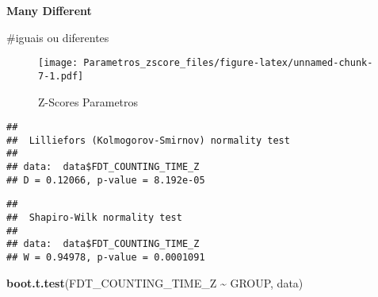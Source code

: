 \documentclass[
]{article}
\newenvironment{Shaded}{\begin{snugshade}}{\end{snugshade}}
\newcommand{\AttributeTok}[1]{\textcolor[rgb]{0.13,0.29,0.53}{#1}}
\newcommand{\DecValTok}[1]{\textcolor[rgb]{0.00,0.00,0.81}{#1}}
\newcommand{\FunctionTok}[1]{\textcolor[rgb]{0.13,0.29,0.53}{\textbf{#1}}}
\newcommand{\NormalTok}[1]{#1}
\newcommand{\SpecialCharTok}[1]{\textcolor[rgb]{0.81,0.36,0.00}{\textbf{#1}}}
\newcommand{\StringTok}[1]{\textcolor[rgb]{0.31,0.60,0.02}{#1}}
\begin{document}
\textbf{Many Different}

\#iguais ou diferentes

\begin{Shaded}
\end{Shaded}

\begin{figure}
\centering
\texttt{[image: Parametros\_zscore\_files/figure-latex/unnamed-chunk-7-1.pdf]}
\caption{Z-Scores Parametros}
\end{figure}

\begin{Shaded}
\end{Shaded}

\begin{verbatim}
## 
##  Lilliefors (Kolmogorov-Smirnov) normality test
## 
## data:  data$FDT_COUNTING_TIME_Z
## D = 0.12066, p-value = 8.192e-05
\end{verbatim}

\begin{Shaded}
\end{Shaded}

\begin{verbatim}
## 
##  Shapiro-Wilk normality test
## 
## data:  data$FDT_COUNTING_TIME_Z
## W = 0.94978, p-value = 0.0001091
\end{verbatim}

\begin{Shaded}
\begin{Highlighting}[]
\FunctionTok{boot.t.test}\NormalTok{(FDT\_COUNTING\_TIME\_Z }\SpecialCharTok{\textasciitilde{}}\NormalTok{ GROUP, data)}
\end{Highlighting}
\end{Shaded}
\end{document}
